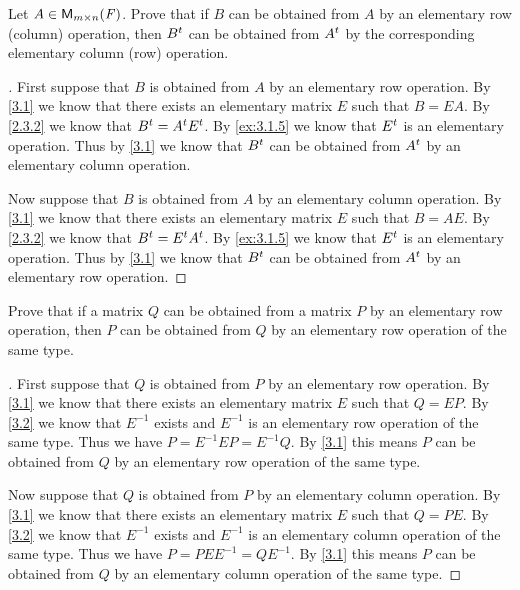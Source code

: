 \begin{ex}\label{ex:3.1.6}
  Let \(A \in \mathsf{M}_{{m} \times n}({\mathit{F}})\).
  Prove that if \(B\) can be obtained from \(A\) by an elementary row (column) operation, then \({B}^{t}\) can be obtained from \({A}^{t}\) by the corresponding elementary column (row) operation.
\end{ex}

\begin{proof}[]
  First suppose that \(B\) is obtained from \(A\) by an elementary row operation.
  By \cref{3.1} we know that there exists an elementary matrix \(E\) such that \(B = EA\).
  By \cref{2.3.2} we know that \({B}^{t} = {A}^{t} {E}^{t}\).
  By \cref{ex:3.1.5} we know that \({E}^{t}\) is an elementary operation.
  Thus by \cref{3.1} we know that \({B}^{t}\) can be obtained from \({A}^{t}\) by an elementary column operation.

  Now suppose that \(B\) is obtained from \(A\) by an elementary column operation.
  By \cref{3.1} we know that there exists an elementary matrix \(E\) such that \(B = AE\).
  By \cref{2.3.2} we know that \({B}^{t} = {E}^{t} {A}^{t}\).
  By \cref{ex:3.1.5} we know that \({E}^{t}\) is an elementary operation.
  Thus by \cref{3.1} we know that \({B}^{t}\) can be obtained from \({A}^{t}\) by an elementary row operation.
\end{proof}

\setcounter{ex}{7}
\begin{ex}\label{ex:3.1.8}
  Prove that if a matrix \(Q\) can be obtained from a matrix \(P\) by an elementary row operation, then \(P\) can be obtained from \(Q\) by an elementary row operation of the same type.
\end{ex}

\begin{proof}[]
  First suppose that \(Q\) is obtained from \(P\) by an elementary row operation.
  By \cref{3.1} we know that there exists an elementary matrix \(E\) such that \(Q = EP\).
  By \cref{3.2} we know that \(E^{-1}\) exists and \(E^{-1}\) is an elementary row operation of the same type.
  Thus we have \(P = E^{-1} E P = E^{-1} Q\).
  By \cref{3.1} this means \(P\) can be obtained from \(Q\) by an elementary row operation of the same type.

  Now suppose that \(Q\) is obtained from \(P\) by an elementary column operation.
  By \cref{3.1} we know that there exists an elementary matrix \(E\) such that \(Q = PE\).
  By \cref{3.2} we know that \(E^{-1}\) exists and \(E^{-1}\) is an elementary column operation of the same type.
  Thus we have \(P = P E E^{-1} = Q E^{-1}\).
  By \cref{3.1} this means \(P\) can be obtained from \(Q\) by an elementary column operation of the same type.
\end{proof}

